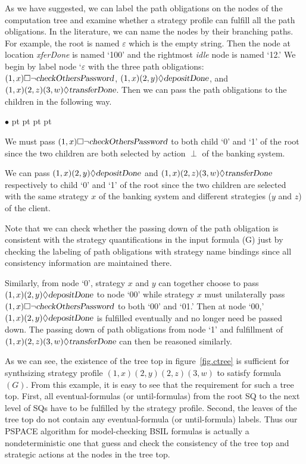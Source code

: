 \documentclass[11pt]{article}
\newcommand{\pfrr}{\Box}
\newcommand{\pevt}{\Diamond}
\newenvironment{list1}{\begin{list}{$\bullet$}
{\topsep 0 pt \parsep 0 pt \partopsep 0 pt \itemsep 0 pt}}{\end{list}}
\begin{document}
As we have suggested, we can label the path obligations on the nodes of 
the computation tree and examine whether a strategy profile can fulfill 
all the path obligations. 
In the literature, we can name the nodes by their branching paths.  
For example, the root is named $\varepsilon$ which is the empty string. 
Then the node at location {\em xferDone} is named `100' and 
the rightmost {\em idle} node is named `12.' 
We begin by label node `$\varepsilon$ with the three path obligations: 
$(1,x) \pfrr \neg \mbox{\sl checkOthersPassword}$, 
$(1,x)(2,y)\pevt \mbox{\sl depositDone}$, and $(1,x)(2,z)(3,w)\pevt\mbox{\sl transferDone}$.  
Then we can pass the path obligations to the children in the following way. 
\begin{list1} 
\item We must pass $(1,x) \pfrr \neg \mbox{\sl checkOthersPassword}$ to 
  both child `0' and `1' of the root since the two children 
  are both selected by action $\perp$ of the banking system. 
\item We can pass $(1,x)(2,y)\pevt \mbox{\sl depositDone}$ 
	and $(1,x)(2,z)(3,w)\pevt\mbox{\sl transferDone}$ respectively to 
	child `0' and `1' of the root since 
	the two children are selected with the same strategy $x$ of the banking system 
	and different strategies ($y$ and $z$) of the client.  
\end{list1} 
Note that we can check whether the passing down of the path obligation 
is consistent with the 
strategy quantifications in the input formula (G) just by 
checking the labeling of path obligations with 
strategy name bindings since 
all consistency information are maintained there. 

Similarly, from node `0', strategy $x$ and $y$ can together choose to pass 
$(1,x)(2,y)\pevt \mbox{\sl depositDone}$ to node `00' while 
strategy $x$ must unilaterally pass 
$(1,x) \pfrr \neg \mbox{\sl checkOthersPassword}$ 
to both `00' and `01.'  
Then at node `00,' $(1,x)(2,y)\pevt \mbox{\sl depositDone}$ is fulfilled 
eventually and no longer need be passed down.  
The passing down of path obligations from node `1' and fulfillment of 
$(1,x)(2,z)(3,w)\pevt\mbox{\sl transferDone}$ can then be reasoned similarly.  

As we can see, the existence of the tree top in figure~\ref{fig.ctree} is 
sufficient for synthsizing strategy profile $(1,x)(2,y)(2,z)(3,w)$ to satisfy 
formula $(G)$.  
From this example, it is easy to see that the requirement for such a tree top.  
First, all eventual-formulas (or until-formulas) from the root SQ to the 
next level of SQs have to be fulfilled by the strategy profile.  
Second, the leaves of the tree top do not contain any eventual-formula (or until-formula) labels.  
Thus our PSPACE algorithm for model-checking BSIL formulas is actually 
a nondeterministic one that guess and check the consistency of 
the tree top and strategic actions at the nodes 
in the tree top.  
\end{document}
